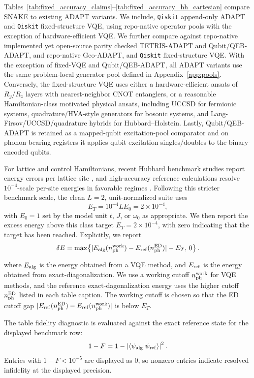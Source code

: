 \documentclass[
  reprint,
  amsmath,
  amssymb,
  aps,
  pra,
  nofootinbib,
  superscriptaddress,
  floatfix
]{revtex4-2}
\newcommand{\braket}[2]{\langle #1|#2\rangle}
\begin{document}
Tables~\ref{tab:fixed_accuracy_claims}--\ref{tab:fixed_accuracy_hh_cartesian} compare SNAKE to existing ADAPT variants. We include, \texttt{Qiskit} append-only ADAPT and \texttt{Qiskit} fixed-structure VQE, using repo-native operator pools with the exception of hardware-efficient VQE. We further compare against repo-native implemented yet open-source parity checked TETRIS-ADAPT and Qubit/QEB-ADAPT, and repo-native Geo-ADAPT, and \texttt{Qiskit} fixed-structure VQE. With the exception of fixed-VQE and Qubit/QEB-ADAPT, all ADAPT variants use the same problem-local
generator pool defined in Appendix~\ref{app:pools}. Conversely, the fixed-structure VQE uses either a hardware-efficient ansats of \(R_y/R_z\) layers with nearest-neighbor CNOT entanglers, or a reasonable Hamiltonian-class motivated physical ansats, including UCCSD for fermionic systems, quadrature/HVA-style generators for bosonic
systems, and Lang-Firsov/UCCSD/quadrature hybrids for Hubbard--Holstein.  Lastly, Qubit/QEB-ADAPT is retained as a mapped-qubit excitation-pool comparator and on phonon-bearing
registers it applies qubit-excitation singles/doubles to the
binary-encoded qubits. 

For lattice and control Hamiltonians, recent Hubbard benchmark studies
report energy errors per lattice site \cite{Alvertis2024HubbardVQE},
and high-accuracy reference calculations resolve \(10^{-4}\)-scale
per-site energies in favorable regimes
\cite{LeBlanc2015HubbardBenchmarks,Qin2016AFQMCHubbard}. Following
this stricter benchmark scale, the clean \(L=2\),
unit-normalized suite uses
\[
E_T=10^{-4}LE_0=2\times10^{-4},
\]
with \(E_0=1\) set by the model unit \(t\), \(J\), or \(\omega_0\) as
appropriate.  
We then report the excess energy above this class target \(E_T=2\times 10^{-4}\), with zero indicating that the target has been reached.  Explicitly, we report
\[
\delta E=\max\!\left\{|E_{\rm alg}(n_{\rm ph}^{\rm work})-E_{\rm ref}(n_{\rm ph}^{\rm ED})|-E_T,\,0\right\}.
\]

where $E_{\rm alg}$  is the energy obtained from a VQE method, and $E_{\rm ref}$ is the energy obtained from exact-diagonalization. We use a working cutoff \(n_{\rm ph}^{\rm work}\) for VQE methods, and the reference exact-dagonalization energy uses the higher cutoff \(n_{\rm ph}^{\rm ED}\) listed in each table caption.  The working cutoff is chosen so that the ED cutoff gap \(|E_{\rm ref}(n_{\rm ph}^{\rm ED})-E_{\rm ref}(n_{\rm ph}^{\rm work})|\) is below \(E_T\).

The table fidelity diagnostic is evaluated against the exact reference state for the displayed benchmark row:
\begin{equation}
1-F=1-\left|\braket{\psi_{\rm alg}}{\psi_{\rm ref}}\right|^2 .
\label{eq:fidelity_diagnostic}
\end{equation}
Entries with \(1-F<10^{-5}\) are displayed as \(0\), so nonzero entries indicate resolved infidelity at the displayed precision.
\end{document}
